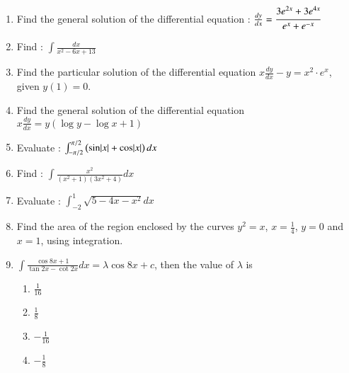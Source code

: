\documentclass[12pt,-letter paper]{article}
\providecommand{\brak}[1]{\ensuremath{\left(#1\right)}}
\begin{document}
\begin{enumerate}
      \item Find the general solution of the differential equation : $\frac{dy}{dx}=\cfrac{3e^{2x}+3e^{4x}}{e^x + e^{-x}}$
      \item Find : $\int \frac{dx}{x^2 - 6x + 13}$
      \item Find the particular solution of the differential equation  $x \frac{dy}{dx}-y = x^2 \cdot e^x$, given  $y(1) = 0$.
      \item Find the general solution of the differential equation $x\frac{dy}{dx}=y(\log y- \log x+1)$
      \item Evaluate : $\int_{-\pi/2}^{\pi/2} \brak{\sin \abs{x} + \cos \abs{x} }dx$
      \item Find : $\int \frac{x^2}{ (x^2 + 1)(3x^2 + 4)}dx$
      \item Evaluate : $\int_{-2}^1 \sqrt{5-4x-x^2}dx$
      \item Find the area of the region enclosed by the curves $y^2 = x$, $x = \frac{1}{4}$, $y = 0$ and $x = 1$, using integration.
      \item $\int \frac{\cos 8x + 1}{\tan 2x - \cot 2x} dx = \lambda \cos 8x + c $, then the value of $\lambda$ is 
      \begin{enumerate}
          \item  $\frac{1}{16}$
          \item  $\frac{1}{8}$
          \item  $-\frac{1}{16}$
          \item  $-\frac{1}{8}$
          

\end{enumerate}
\end{enumerate}
\end{document}
